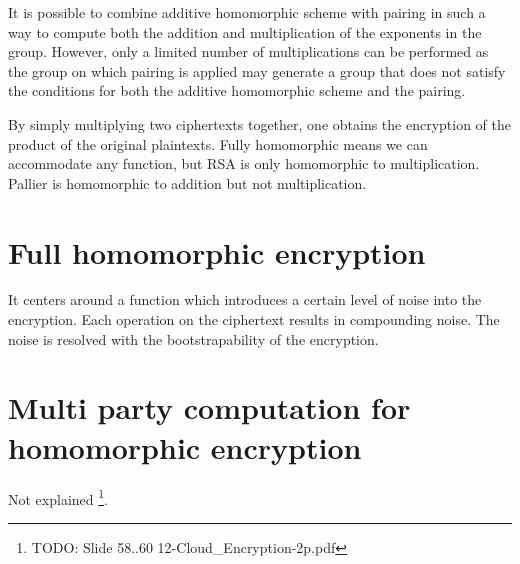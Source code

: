 It is possible to combine additive homomorphic scheme with pairing in such a way to compute both the addition and multiplication of the exponents in the group. However, only a limited number of multiplications can be performed as the group on which pairing is applied may generate a group that does not satisfy the conditions for both the additive homomorphic scheme and the pairing.

By simply multiplying two ciphertexts together, one obtains the encryption of the product of the original plaintexts.
Fully homomorphic means we can accommodate any function, but RSA is only homomorphic to multiplication. Pallier is homomorphic to addition but not multiplication.


\section{Full homomorphic encryption}
It centers around a function which introduces a certain level of noise into the encryption. Each operation on the ciphertext results in compounding noise. The noise is resolved with the bootstrapability of the encryption.

\section{Multi party computation for homomorphic encryption}

Not explained \footnote{TODO: Slide 58..60 12-Cloud\_Encryption-2p.pdf}.
